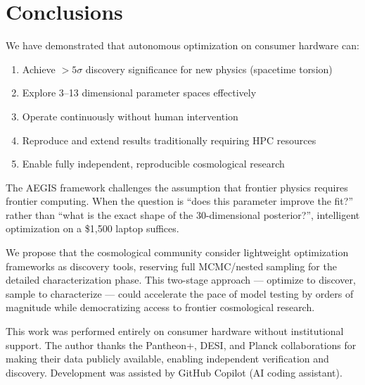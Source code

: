 \documentclass[twocolumn,showpacs,preprintnumbers,amsmath,amssymb,prl]{revtex4-2}
\begin{document}
\section{Conclusions}

We have demonstrated that autonomous optimization on consumer hardware can:
\begin{enumerate}
\item Achieve $>5\sigma$ discovery significance for new physics (spacetime torsion)
\item Explore 3--13 dimensional parameter spaces effectively
\item Operate continuously without human intervention
\item Reproduce and extend results traditionally requiring HPC resources
\item Enable fully independent, reproducible cosmological research
\end{enumerate}

The AEGIS framework challenges the assumption that frontier physics requires frontier computing. When the question is ``does this parameter improve the fit?'' rather than ``what is the exact shape of the 30-dimensional posterior?'', intelligent optimization on a \$1,500 laptop suffices.

We propose that the cosmological community consider lightweight optimization frameworks as discovery tools, reserving full MCMC/nested sampling for the detailed characterization phase. This two-stage approach --- optimize to discover, sample to characterize --- could accelerate the pace of model testing by orders of magnitude while democratizing access to frontier cosmological research.

\begin{acknowledgments}
This work was performed entirely on consumer hardware without institutional support. The author thanks the Pantheon+, DESI, and Planck collaborations for making their data publicly available, enabling independent verification and discovery. Development was assisted by GitHub Copilot (AI coding assistant).
\end{acknowledgments}
\end{document}
